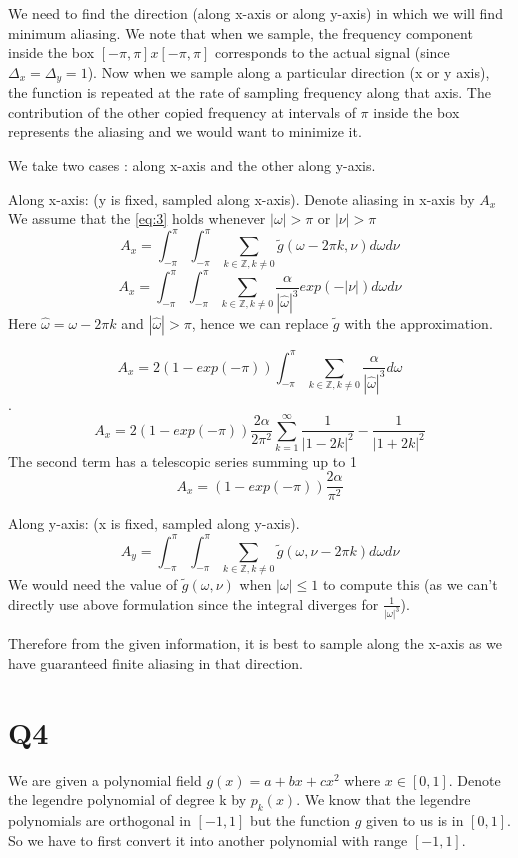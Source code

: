 \documentclass{article}
\begin{document}
We need to find the direction (along x-axis or along y-axis) in which we will find minimum aliasing. We note that when we sample, the frequency component inside the box $[-\pi, \pi] x [-\pi, \pi]$ corresponds to the actual signal (since $\Delta_x = \Delta_y =1$). Now when we sample along a particular direction (x or y axis), the function is repeated at the rate of sampling frequency along that axis. The contribution of the other copied frequency at intervals of $\pi$ inside the box represents the aliasing and we would want to minimize it.

We take two cases : along x-axis and the other along y-axis.

Along x-axis: (y is fixed, sampled along x-axis). Denote aliasing in x-axis by $A_x$
We assume that the \ref{eq:3} holds whenever $|\omega| > \pi$ or $|\nu| > \pi$
$$A_x = \int_{-\pi}^{\pi} \int_{-\pi}^{\pi} \sum_{k \in \mathbb{Z}, k \ne 0} \tilde{g}(\omega - 2 \pi k, \nu) d\omega d\nu$$
$$A_x = \int_{-\pi}^{\pi} \int_{-\pi}^{\pi} \sum_{k \in \mathbb{Z}, k \ne 0} \frac{\alpha}{|\hat{\omega}|^3}exp(-|\nu|) d\omega d\nu$$
Here $\hat{\omega} = \omega - 2 \pi k$ and $|\hat{\omega}| > \pi$, hence we can replace $\tilde{g}$ with the approximation.

$$A_x = 2(1 - exp(-\pi)) \int_{-\pi}^{\pi} \sum_{k \in \mathbb{Z}, k \ne 0} \frac{\alpha}{|\hat{\omega}|^3} d\omega$$.
$$A_x = 2(1 - exp(-\pi)) \frac{2 \alpha}{2\pi^2} \sum_{k = 1}^{\infty} \frac{1}{|1-2k|^2} - \frac{1}{|1+2k|^2}$$
The second term has a telescopic series summing up to 1
$$A_x = (1 - exp(-\pi)) \frac{2\alpha}{\pi^2}$$

Along y-axis: (x is fixed, sampled along y-axis).
$$A_y = \int_{-\pi}^{\pi} \int_{-\pi}^{\pi} \sum_{k \in \mathbb{Z}, k \ne 0} \tilde{g}(\omega, \nu - 2\pi k) d\omega d\nu$$
We would need the value of $\tilde{g}(\omega, \nu)$ when $|\omega| \le 1$ to compute this (as we can't directly use above formulation since the integral diverges for $\frac{1}{|\omega|^3}$).

Therefore from the given information, it is best to sample along the x-axis as we have guaranteed finite aliasing in that direction.

\section*{Q4}
We are given a polynomial field $g(x) = a + bx + cx^2$ where $x \in [0, 1]$. Denote the legendre polynomial of degree k by $p_k(x)$. We know that the legendre polynomials are orthogonal in $[-1, 1]$ but the function $g$ given to  us is in $[0, 1]$. So we have to first convert it into another polynomial with range $[-1, 1]$.
\end{document}
